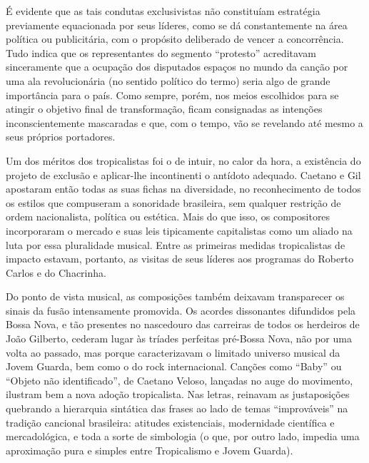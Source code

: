 É evidente que as tais condutas exclusivistas não constituíam estratégia
previamente equacionada por seus líderes, como se dá constantemente na
área política ou publicitária, com o propósito deliberado de vencer a
concorrência. Tudo indica que os representantes do segmento ``protesto''
acreditavam sinceramente que a ocupação dos disputados espaços no mundo
da canção por uma ala revolucionária (no sentido político do termo)
seria algo de grande importância para o país. Como sempre, porém, nos
meios escolhidos para se atingir o objetivo final de transformação,
ficam consignadas as intenções inconscientemente mascaradas e que, com o
tempo, vão se revelando até mesmo a seus próprios portadores.

Um dos méritos dos tropicalistas foi o de intuir, no calor da hora, a
existência do projeto de exclusão e aplicar-lhe incontinenti o antídoto
adequado. Caetano e Gil apostaram então todas as suas fichas na
diversidade, no reconhecimento de todos os estilos que compuseram a
sonoridade brasileira, sem qualquer restrição de ordem nacionalista,
política ou estética. Mais do que isso, os compositores incorporaram o
mercado e suas leis tipicamente
capitalistas como um aliado na luta por essa pluralidade musical. Entre
as primeiras medidas tropicalistas de impacto estavam, portanto, as
visitas de seus líderes aos programas do Roberto Carlos e do Chacrinha.

Do ponto de vista musical, as composições também deixavam transparecer
os sinais da fusão intensamente promovida. Os acordes dissonantes
difundidos pela Bossa Nova, e tão presentes no nascedouro das carreiras
de todos os herdeiros de João Gilberto, cederam lugar às tríades
perfeitas pré-Bossa Nova, não por uma volta ao passado, mas porque
caracterizavam o limitado universo musical da Jovem Guarda, bem como o
do rock internacional. Canções como ``Baby'' ou ``Objeto não
identificado'', de Caetano Veloso, lançadas no auge do movimento,
ilustram bem a nova adoção tropicalista. Nas letras, reinavam as
justaposições quebrando a hierarquia sintática das frases ao lado de
temas ``improváveis'' na tradição cancional brasileira: atitudes
existenciais, modernidade científica e mercadológica, e toda a sorte de
simbologia (o que, por outro lado, impedia uma aproximação pura e
simples entre Tropicalismo e Jovem Guarda).

